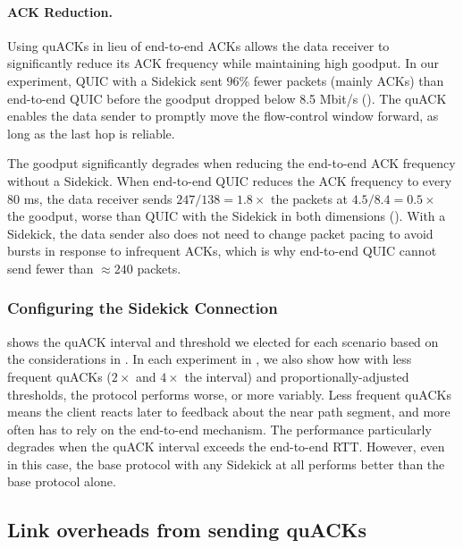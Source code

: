 \paragraph{ACK Reduction.}

Using quACKs in lieu of end-to-end ACKs allows the data receiver to
significantly reduce its ACK frequency while maintaining high goodput.
In our experiment, QUIC with a Sidekick sent $96\%$ fewer packets (mainly ACKs)
than end-to-end QUIC before the goodput dropped below 8.5 Mbit/s
().
The quACK enables the data sender to promptly move the flow-control window forward,
as long as the last hop is reliable.

The goodput significantly degrades when reducing the end-to-end ACK frequency
without a Sidekick. When end-to-end QUIC reduces the ACK frequency to every
80 ms, the data receiver sends $247 / 138 = 1.8\times$ the packets at
$4.5 / 8.4 = 0.5\times$ the goodput, worse than QUIC with the Sidekick
in both dimensions (). With a Sidekick,
the data sender also does not need to change packet pacing to avoid bursts in
response to infrequent ACKs, which is why end-to-end QUIC cannot send fewer
than $\approx 240$ packets.

\subsubsection{Configuring the Sidekick Connection}
 shows the quACK interval and threshold we
elected for each scenario based on the considerations in
. In each experiment in ,
we also show how with less frequent quACKs ($2\times$ and $4\times$ the
interval) and proportionally-adjusted thresholds, the protocol performs worse,
or more variably. Less frequent quACKs means the client reacts later to
feedback about the near path segment, and more often has to rely on the
end-to-end mechanism. The performance particularly degrades when the quACK
interval exceeds the end-to-end RTT. However, even in this case, the base
protocol with any Sidekick at all performs better than the base protocol alone\@.

\subsection{Link overheads from sending quACKs}
\label{sec:sidekick:evaluation:link-overheads}



